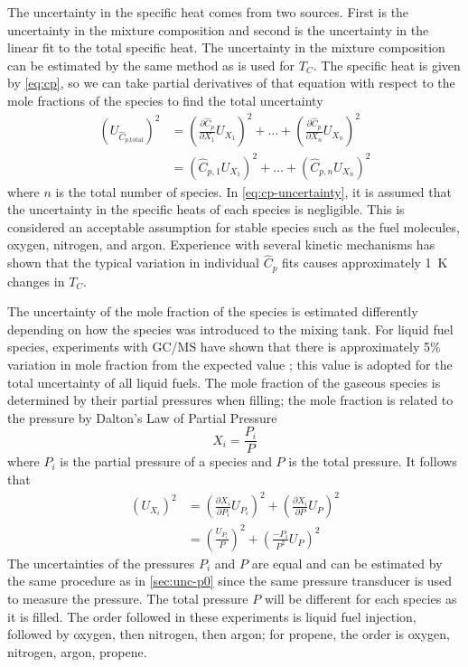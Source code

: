 \documentclass[12pt, letterpaper]{article}
\begin{document}
The uncertainty in the specific heat comes from two sources. First is the
uncertainty in the mixture composition and second is the uncertainty in
the linear fit to the total specific heat. The uncertainty in the mixture
composition can be estimated by the same method as is used for $T_C$. The
specific heat is given by \autoref{eq:cp}, so we can take partial derivatives
of that equation with respect to the mole fractions of the species to find
the total uncertainty
%
\begin{equation}
\label{eq:cp-uncertainty}
\begin{split}
\left(U_{\hat{C}_{p\text{,total}}}\right)^2 &= \left(\frac{\partial \hat{C}_p}{\partial X_1} U_{X_1}\right)^2 + \ldots + \left(\frac{\partial \hat{C}_p}{\partial X_n} U_{X_n}\right)^2 \\
&= \left(\hat{C}_{p,1} U_{X_1}\right)^2 + \ldots + \left(\hat{C}_{p,n} U_{X_n}\right)^2
\end{split}
\end{equation}
%
where $n$ is the total number of species. In \autoref{eq:cp-uncertainty},
it is assumed that the uncertainty in the specific heats of each species
is negligible. This is considered an acceptable assumption for stable species
such as the fuel molecules, oxygen, nitrogen, and argon. Experience with
several kinetic mechanisms has shown that the typical variation in individual
$\hat{C}_p$ fits causes approximately \SI{1}{\kelvin} changes in $T_C$.

The uncertainty of the mole fraction of the species is estimated differently
depending on how the species was introduced to the mixing tank. For liquid fuel
species, experiments with GC/MS have shown that there is approximately 5\%
variation in mole fraction from the expected value \cite{Weber2011}; this value is adopted for
the total uncertainty of all liquid fuels. The mole fraction of the gaseous species
is determined by their partial pressures when filling; the mole fraction is
related to the pressure by Dalton's Law of Partial Pressure
\cite{Dalton1801,Gillespie1930}
%
\begin{equation}
X_i = \frac{P_i}{P}
\end{equation}
%
where $P_i$ is the partial pressure of a species and $P$ is the total pressure.
It follows that
%
\begin{equation}
\begin{split}
\left(U_{X_i}\right)^2 &= \left(\frac{\partial X_i}{\partial P_i} U_{P_i}\right)^2 + \left(\frac{\partial X_i}{\partial P} U_P\right)^2 \\
&= \left(\frac{U_{P_i}}{P}\right)^2 + \left(\frac{{-P_i}}{P^2} U_P\right)^2
\end{split}
\end{equation}
%
The uncertainties of the pressures $P_i$ and $P$ are equal and can be estimated by
the same procedure as in \autoref{sec:unc-p0} since the same pressure transducer
is used to measure the pressure. The total pressure $P$ will be different for
each species as it is filled. The order followed in these experiments is
liquid fuel injection, followed by oxygen, then nitrogen, then argon; for
propene, the order is oxygen, nitrogen, argon, propene.
\end{document}
